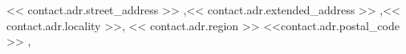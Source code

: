 << contact.adr.street_address >> \sep << contact.adr.extended_address >> \sep << contact.adr.locality >>, << contact.adr.region >> <<contact.adr.postal_code >> \sep {}

